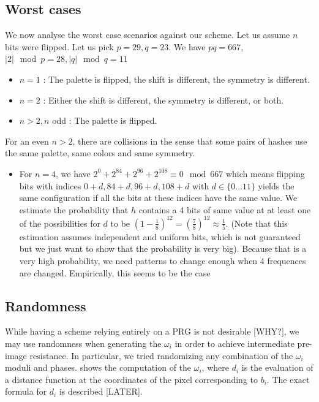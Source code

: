 \documentclass{article}
\begin{document}
\subsection{Worst cases}
We now analyse the worst case scenarios against our scheme. Let us assume $n$ bits were flipped. Let us pick $p=29, q=23$. We have $pq = 667$, $|2| \mod p = 28, |q| \mod q = 11$
\begin{itemize}
	\item $n=1$ : The palette is flipped, the shift is different, the symmetry is different.
	\item $n=2$ : Either the shift is different, the symmetry is different, or both.
	\item $n > 2, n$ odd : The palette is flipped.
\end{itemize}
For an even $n > 2$, there are collisions in the sense that some pairs of hashes use the same palette, same colors and same symmetry.
\begin{itemize}
	\item For $n = 4$, we have $2^0 + 2^{84} + 2^{96} + 2^{108} \equiv 0 \mod 667$ which means flipping bits with indices $0 + d, 84 + d, 96 + d, 108 + d$ with $d \in \{0 \dots 11\}$ yields the same configuration if all the bits at these indices have the same value. We estimate the probability that $h$ contains a 4 bits of same value at at least one of the possibilities for $d$ to be $\left(1 - \frac{1}{8}\right)^{12} = \left(\frac{7}{8}\right)^{12} \approx \frac{1}{5}$. (Note that this estimation assumes independent and uniform bits, which is not guaranteed but we just want to show that the probability is very big). Because that is a very high probability, we need patterns to change enough when 4 frequences are changed. Empirically, this seems to be the case
\end{itemize}

\subsection{Randomness}
While having a scheme relying entirely on a PRG is not desirable [WHY?], we may use randomness when generating the $\omega_i$ in order to achieve intermediate pre-image resistance. In particular, we tried randomizing any combination of the $\omega_i$ moduli and phases.  shows the computation of the $\omega_i$, where $d_i$ is the evaluation of a distance function at the coordinates of the pixel corresponding to $b_i$. The exact formula for $d_i$ is described [LATER].
\end{document}
